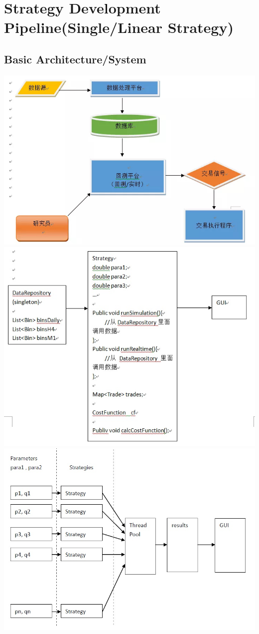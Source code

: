 \documentclass[11pt, openany]{book}              %
\begin{document}
\section{ Strategy Development Pipeline(Single/Linear Strategy) }
\subsection{Basic Architecture/System}
\includegraphics[scale=0.5]{1.JPG}
\includegraphics[scale=0.5]{2.JPG}
\includegraphics[scale=0.5]{3.JPG}
\end{document}
